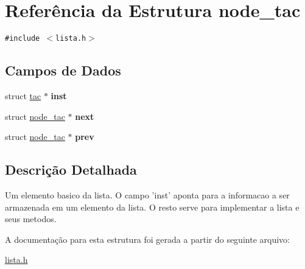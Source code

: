 \hypertarget{structnode__tac}{
\section{Referência da Estrutura node\_\-tac}
\label{structnode__tac}
}
{\tt \#include $<$lista.h$>$}

\subsection*{Campos de Dados}
\begin{CompactItemize}
\item 
\hypertarget{structnode__tac_30e49a29ec5242fba75f64e739cd8539}{
struct \hyperlink{structtac}{tac} $\ast$ \textbf{inst}}
\label{structnode__tac_30e49a29ec5242fba75f64e739cd8539}

\item 
\hypertarget{structnode__tac_a67e7998f0070fc240f79534788b7587}{
struct \hyperlink{structnode__tac}{node\_\-tac} $\ast$ \textbf{next}}
\label{structnode__tac_a67e7998f0070fc240f79534788b7587}

\item 
\hypertarget{structnode__tac_7ffb36df18c662a79e17e0c01d630aff}{
struct \hyperlink{structnode__tac}{node\_\-tac} $\ast$ \textbf{prev}}
\label{structnode__tac_7ffb36df18c662a79e17e0c01d630aff}

\end{CompactItemize}


\subsection{Descrição Detalhada}
Um elemento basico da lista. O campo 'inst' aponta para a informacao a ser armazenada em um elemento da lista. O resto serve para implementar a lista e seus metodos. 

A documentação para esta estrutura foi gerada a partir do seguinte arquivo:\begin{CompactItemize}
\item 
\hyperlink{lista_8h}{lista.h}\end{CompactItemize}
